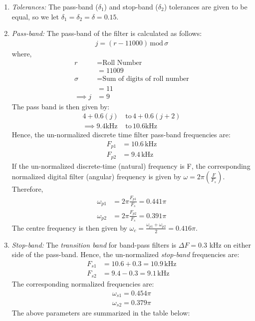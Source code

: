 \documentclass{article}
\begin{document}
\begin{enumerate}
\item {\em Tolerances:}  The pass-band ($\delta_1$) and stop-band ($\delta_2$) tolerances are given to
be equal, so we let $\delta_1 = \delta_2 = \delta = 0.15$.

\item {\em Pass-band:}  The pass-band of the filter is calculated as follows: 
\begin{align*}
    j = (r - 11000) \, \text{mod} \, \sigma
\end{align*}
where, 
\begin{align*}
    r &= \text{Roll Number}\\
    &= 11009\\
    \sigma &= \text{Sum of digits of roll number}\\
    &= 11\\
    \implies j &= 9
\end{align*}
The pass band is then given by:
\begin{align*}
    4 + 0.6(j)\,  &\text{to} \, 4 + 0.6( j + 2)\\ 
    \implies 9.4 \text{kHz} \, &\text{to} \, 10.6\text{kHz} 
\end{align*}
Hence, the un-normalized discrete time filter
pass-band frequencies are:
\begin{align*}
    F_{p1} &= 10.6\, \text{kHz}\\
    F_{p2} &= 9.4\, \text{kHz}
\end{align*}
If the un-normalized  discrete-time (natural) frequency is F, the corresponding normalized digital filter (angular) frequency is given by $\omega = 2\pi
\left(\frac{F}{F_s}\right)$. Therefore,
\begin{align*}
\omega_{p1} &= 2\pi\frac{F_{p1}}{F_s}  = 0.441\pi\\ \omega_{p2} &= 2\pi\frac{F_{p2}}{F_s}  = 0.391\pi 
\end{align*}
The centre frequency is then given by  $\omega_c = \frac{\omega_{p1} + \omega_{p2}}{2} = 0.416\pi$.  

\item {\em Stop-band:}  The {\em transition band} for band-pass filters is $\Delta F = 0.3$ kHz on either side of the pass-band.
Hence, the un-normalized {\em stop-band} frequencies are:
\begin{align*}
F_{s1} &= 10.6 + 0.3 = 10.9\, \text{kHz}\\
F_{s2} &= 9.4 - 0.3 = 9.1\, \text{kHz}
\end{align*}
The corresponding normalized frequencies are:
\begin{align*}
    \omega_{s1} = 0.454 \pi\\
    \omega_{s2} =  0.379 \pi
\end{align*}
The above parameters are summarized in the table below:

\end{enumerate}
\end{document}
